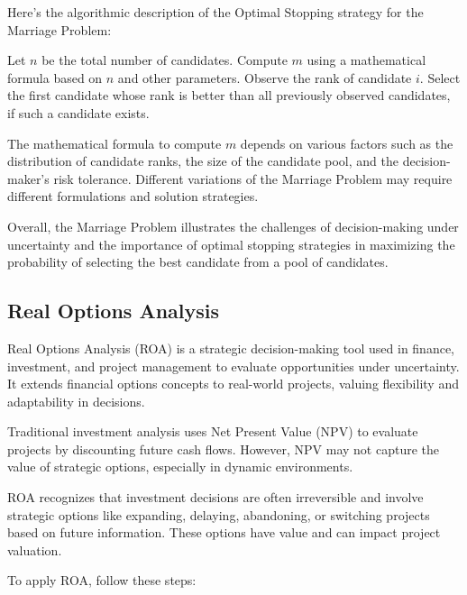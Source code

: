 \documentclass[12pt]{book} %
\begin{document}
Here's the algorithmic description of the Optimal Stopping strategy for the Marriage Problem:
\FloatBarrier
\begin{algorithm}
\caption{Optimal Stopping Algorithm for Marriage Problem}
\begin{algorithmic}[1]
\State Let \(n\) be the total number of candidates.
\State Compute \(m\) using a mathematical formula based on \(n\) and other parameters.
    \State Observe the rank of candidate \(i\).
\EndFor
\State Select the first candidate whose rank is better than all previously observed candidates, if such a candidate exists.
\end{algorithmic}
\end{algorithm}
\FloatBarrier
The mathematical formula to compute \(m\) depends on various factors such as the distribution of candidate ranks, the size of the candidate pool, and the decision-maker's risk tolerance. Different variations of the Marriage Problem may require different formulations and solution strategies.

Overall, the Marriage Problem illustrates the challenges of decision-making under uncertainty and the importance of optimal stopping strategies in maximizing the probability of selecting the best candidate from a pool of candidates.


\subsection{Real Options Analysis}

Real Options Analysis (ROA) is a strategic decision-making tool used in finance, investment, and project management to evaluate opportunities under uncertainty. It extends financial options concepts to real-world projects, valuing flexibility and adaptability in decisions.

Traditional investment analysis uses Net Present Value (NPV) to evaluate projects by discounting future cash flows. However, NPV may not capture the value of strategic options, especially in dynamic environments.

ROA recognizes that investment decisions are often irreversible and involve strategic options like expanding, delaying, abandoning, or switching projects based on future information. These options have value and can impact project valuation.

To apply ROA, follow these steps:
\end{document}
